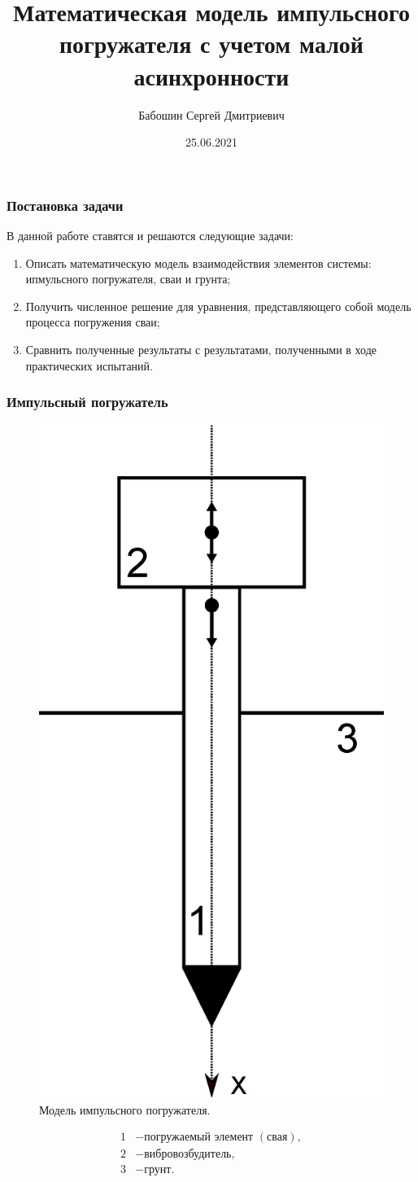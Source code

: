 \documentclass{beamer}
\title{Математическая модель импульсного погружателя с учетом малой асинхронности}
\date{25.06.2021}
\author{Бабошин Сергей Дмитриевич}
\begin{document}
    \frame{\titlepage}

    \begin{frame}
        \frametitle{Постановка задачи}
        В данной работе ставятся и решаются следующие задачи:
        \begin{enumerate}
            \item Описать математическую модель взаимодействия элементов системы: ипмульсного погружателя,
            сваи и грунта;
            \item Получить численное решение для уравнения, представляющего собой модель процесса погружения сваи;
            \item Сравнить полученные результаты с результатами, полученными в ходе практических испытаний.
        \end{enumerate}
    \end{frame}

    \begin{frame}
        \frametitle{Импульсный погружатель}
        \begin{figure}
            \includegraphics[width=0.2\linewidth]{pogruzhatel}
            \caption{Модель импульсного погружателя.}
        \end{figure}
        \begin{align*}
            1 &- \text{погружаемый элемент } (\textit{свая}),\\
            2 &- \textit{вибровозбудитель},\\
            3 &- \textit{грунт}.
        \end{align*}
    \end{frame}
\end{document}
